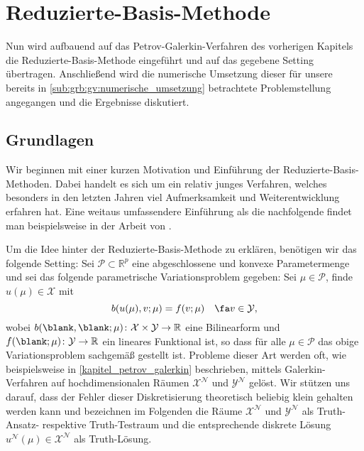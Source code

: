 
\chapter{Reduzierte-Basis-Methode} %
\label{cha:reduzierte_basis_methode}


Nun wird aufbauend auf das Petrov-Galerkin-Verfahren des vorherigen Kapitels die Reduzierte-Basis-Methode eingeführt und auf das gegebene Setting übertragen.
Anschließend wird die numerische Umsetzung dieser für unsere bereits in \cref{sub:grb:gv:numerische_umsetzung} betrachtete Problemstellung angegangen und die Ergebnisse diskutiert.

\section{Grundlagen} %
\label{sub:grb:rb:grundlagen}

Wir beginnen mit einer kurzen Motivation und Einführung der Reduzierte-Basis-Methoden.
Dabei handelt es sich um ein relativ junges Verfahren, welches besonders in den letzten Jahren viel Aufmerksamkeit und Weiterentwicklung erfahren hat.
Eine weitaus umfassendere Einführung als die nachfolgende findet man beispielsweise in der Arbeit von \textcite{Patera:2007un}.

Um die Idee hinter der Reduzierte-Basis-Methode zu erklären, benötigen wir das folgende Setting: Sei $\mathcal P \subset \mathbb{R}^{p}$ eine abgeschlossene und konvexe Parametermenge und sei das folgende parametrische Variationsproblem gegeben:
Sei $\mu \in \mathcal P$, finde $u(\mu) \in \mathcal X$ mit
\begin{equation}
    \label{eq:rbm_varprob_allgemein}
    b(u(\mu), v; \mu) = f(v; \mu) \quad \fa v \in \mathcal Y,
\end{equation}
wobei $b(\blank, \blank; \mu) \colon \mathcal X \times \mathcal Y \to \mathbb{R}$ eine Bilinearform und $f(\blank; \mu) \colon \mathcal Y \to \mathbb{R}$ ein lineares Funktional ist, so dass für alle $\mu \in \mathcal P$ das obige Variationsproblem sachgemäß gestellt ist.
Probleme dieser Art werden oft, wie beispielsweise in \autoref{kapitel_petrov_galerkin} beschrieben, mittels Galerkin-Verfahren auf hochdimensionalen Räumen $\mathcal X^{\mathcal N}$ und $\mathcal Y^{\mathcal N}$ gelöst.
Wir stützen uns darauf, dass der Fehler dieser Diskretisierung theoretisch beliebig klein gehalten werden kann und bezeichnen im Folgenden die Räume $\mathcal X^{\mathcal N}$ und $\mathcal Y^{\mathcal N}$ als Truth-Ansatz- respektive Truth-Testraum und die entsprechende diskrete Lösung $u^{\mathcal N}(\mu) \in \mathcal X^{\mathcal N}$ als Truth-Lösung.

